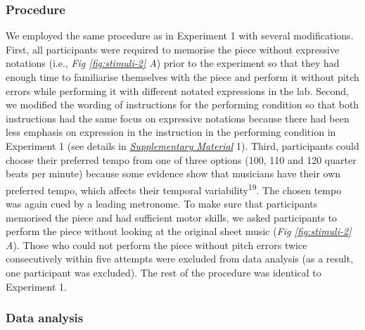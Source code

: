 \documentclass[
  man,floatsintext]{apa6}
\begin{document}
\hypertarget{procedure-2}{%
\subsubsection{Procedure}\label{procedure-2}}

We employed the same procedure as in Experiment 1 with several modifications. First, all participants were required to memorise the piece without expressive notations (i.e., \emph{Fig \ref{fig:stimuli-2} A}) prior to the experiment so that they had enough time to familiarise themselves with the piece and perform it without pitch errors while performing it with different notated expressions in the lab. Second, we modified the wording of instructions for the performing condition so that both instructions had the same focus on expressive notations because there had been less emphasis on expression in the instruction in the performing condition in Experiment 1 (see details in \emph{\protect\hyperlink{supplementary}{Supplementary Material}} 1). Third, participants could choose their preferred tempo from one of three options (100, 110 and 120 quarter beats per minute) because some evidence show that musicians have their own preferred tempo, which affects their temporal variability\textsuperscript{19}. The chosen tempo was again cued by a leading metronome. To make sure that participants memorised the piece and had sufficient motor skills, we asked participants to perform the piece without looking at the original sheet music (\emph{Fig \ref{fig:stimuli-2} A}). Those who could not perform the piece without pitch errors twice consecutively within five attempts were excluded from data analysis (as a result, one participant was excluded). The rest of the procedure was identical to Experiment 1.

\hypertarget{data-analysis-1}{%
\subsubsection{Data analysis}\label{data-analysis-1}}
\end{document}
